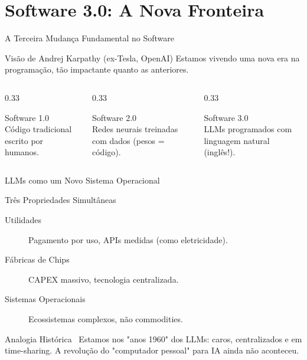 \documentclass[aspectratio=169,12pt]{beamer}
\begin{document}
\section{Software 3.0: A Nova Fronteira}

\begin{frame}{A Terceira Mudança Fundamental no Software}
    \begin{block}{Visão de Andrej Karpathy (ex-Tesla, OpenAI)}
        \centering
        Estamos vivendo uma nova era na programação, tão impactante quanto as anteriores.
    \end{block}
    
    \begin{columns}[T]
        \begin{column}{0.33\textwidth}
            \begin{block}{Software 1.0}
                \faCode\\
                Código tradicional escrito por humanos.
            \end{block}
        \end{column}
        \begin{column}{0.33\textwidth}
            \begin{block}{Software 2.0}
                \faSitemap\\
                Redes neurais treinadas com dados (pesos = código).
            \end{block}
        \end{column}
        \begin{column}{0.33\textwidth}
            \begin{exampleblock}{Software 3.0}
                \faComments\\
                LLMs programados com linguagem natural (inglês!).
            \end{exampleblock}
        \end{column}
    \end{columns}
\end{frame}

\begin{frame}{LLMs como um Novo Sistema Operacional}
    \begin{block}{Três Propriedades Simultâneas}
        \begin{description}
            \item[\textcolor{accent}{\faBolt} Utilidades] Pagamento por uso, APIs medidas (como eletricidade).
            \item[\textcolor{secondary}{\faMicrochip} Fábricas de Chips] CAPEX massivo, tecnologia centralizada.
            \item[\textcolor{success}{\faDesktop} Sistemas Operacionais] Ecossistemas complexos, não commodities.
        \end{description}
    \end{block}

    \begin{alertblock}{Analogia Histórica}
        \faCalendar\, Estamos nos "anos 1960" dos LLMs: caros, centralizados e em time-sharing. A revolução do "computador pessoal" para IA ainda não aconteceu.
    \end{alertblock}
\end{frame}
\end{document}
